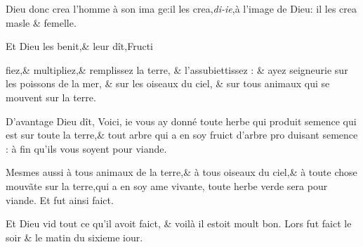 \documentclass[twocolumn,paper=a4,pagesize=pdftex,12pt,headinclude=on]{scrbook}
\newcounter{verse}
\newcommand{\bverse}{%
  \addtocounter{verse}{1}
  \theverse\quad
}
\begin{document}
\bverse Dieu donc crea l'homme à son ima \linebreak
ge:\footnotemarkverse{}\footnotemarkmain{}il les
crea,\emph{di-ie},à l'image de Dieu:
\footnotemarkverse{}il les crea masle \& femelle.

\bverse Et Dieu les benit,\& leur dît,\footnotemarkmain{}Fructi\linebreak


fiez,\& multipliez,\& remplissez la terre,
\& l'assubiettissez : \& \footnotemarkmain{}ayez seigneurie
sur les poissons de la mer, \& sur les oi\-seaux
du ciel, \& sur tous animaux qui se mouvent sur la terre.

\bverse D'avantage Dieu dît, Voici, ie vous
ay donné toute herbe qui produit se\-mence
qui est sur toute la terre,\& tout
arbre qui a en soy fruict d'arbre pro\-
duisant semence : \footnotemarkverse{}à fin qu'ils vous
soyent pour viande.

\bverse Mesmes aussi à tous animaux de la
terre,\& à tous oiseaux du ciel,\& à tou\-te
chose mouv\~ate sur la terre,qui a en
soy ame vivante, toute herbe verde se\-ra
pour viande. Et fut ainsi faict.

\bverse \footnotemarkmain{} \footnotemarkverse{}Et Dieu vid
tout ce qu'il avoit faict, \& voilà il estoit moult bon. Lors
fut faict le soir \& le matin du sixieme
iour.
\end{document}
